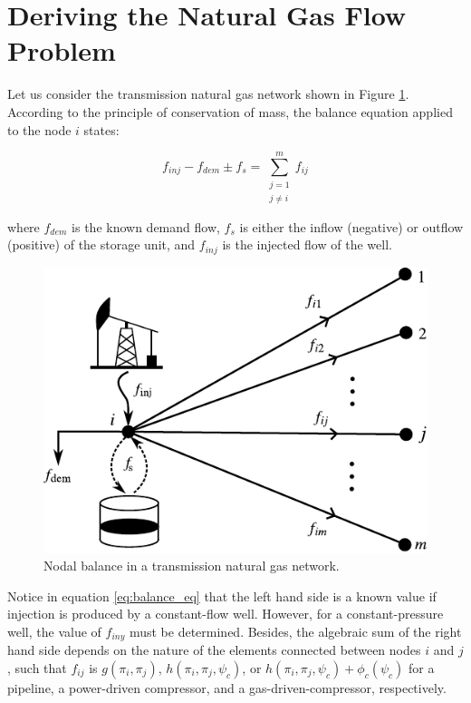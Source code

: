 \section{Deriving the Natural Gas Flow Problem}
\label{sec:NGF_problem}

Let us consider the transmission natural gas network shown in Figure \ref{fig:nodal_balance}. According to the principle of conservation of mass, the balance equation applied to the node $i$ states:

\begin{equation}
	\label{eq:balance_eq}
	f_{inj} - f_{dem} \pm f_s = \sum_{\substack{j=1 \\ j \neq i}}^{m} f_{ij}
\end{equation}

where $f_{dem}$ is the known demand flow, $f_s$ is either the  inflow (negative) or outflow (positive) of the storage unit, and $f_{inj}$ is the injected flow of the well. 

\begin{figure}[!ht]
	\centering
	\includegraphics[scale=0.95]{Figures/Gas_flow_problem}
	\caption{Nodal balance in a transmission natural gas network.}	
	\label{fig:nodal_balance}
\end{figure}

Notice in equation \ref{eq:balance_eq} that the left hand side is a known value if injection is produced by a constant-flow well. However, for a constant-pressure well, the value of $f_{iny}$ must be determined. Besides, the algebraic sum of the right hand side depends on the nature of the elements connected between nodes $i$ and $j$, such that $f_{ij}$ is $g(\pi_i,\pi_j)$, $h(\pi_i,\pi_j,\psi_c)$, or $h(\pi_i,\pi_j,\psi_c)+\phi_c(\psi_c)$ for a pipeline, a power-driven compressor, and a gas-driven-compressor, respectively.

